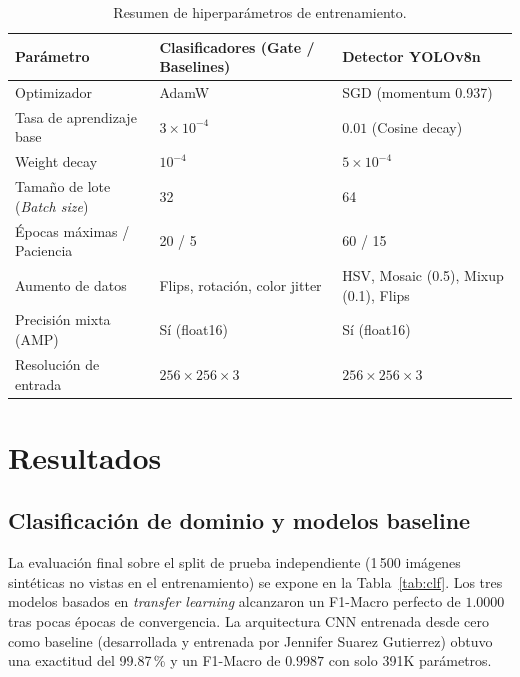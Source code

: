 \documentclass[11pt,a4paper]{article}
\begin{document}
\begin{table}[H]
  \centering\small
  \caption{Resumen de hiperparámetros de entrenamiento.}
  \label{tab:hiper}
  \begin{tabularx}{\textwidth}{@{}l X X@{}}
    \toprule
    \textbf{Parámetro} & \textbf{Clasificadores (Gate / Baselines)} & \textbf{Detector YOLOv8n} \\
    \midrule
    Optimizador & AdamW & SGD (momentum 0.937) \\
    Tasa de aprendizaje base & $3\times10^{-4}$ & $0.01$ (Cosine decay) \\
    Weight decay & $10^{-4}$ & $5\times10^{-4}$ \\
    Tamaño de lote (\emph{Batch size}) & 32 & 64 \\
    Épocas máximas / Paciencia & 20 / 5 & 60 / 15 \\
    Aumento de datos & Flips, rotación, color jitter & HSV, Mosaic (0.5), Mixup (0.1), Flips \\
    Precisión mixta (AMP) & Sí (float16) & Sí (float16) \\
    Resolución de entrada & $256\times256\times3$ & $256\times256\times3$ \\
    \bottomrule
  \end{tabularx}
\end{table}

\section{Resultados}

\subsection{Clasificación de dominio y modelos baseline}
La evaluación final sobre el split de prueba independiente (1\,500 imágenes
sintéticas no vistas en el entrenamiento) se expone en la Tabla~\ref{tab:clf}. Los tres
modelos basados en \emph{transfer learning} alcanzaron un F1-Macro perfecto de $1.0000$
tras pocas épocas de convergencia. La arquitectura CNN entrenada desde cero como
baseline (desarrollada y entrenada por Jennifer Suarez Gutierrez) obtuvo una exactitud
del 99.87\,\% y un F1-Macro de $0.9987$ con solo 391K parámetros.
\end{document}
